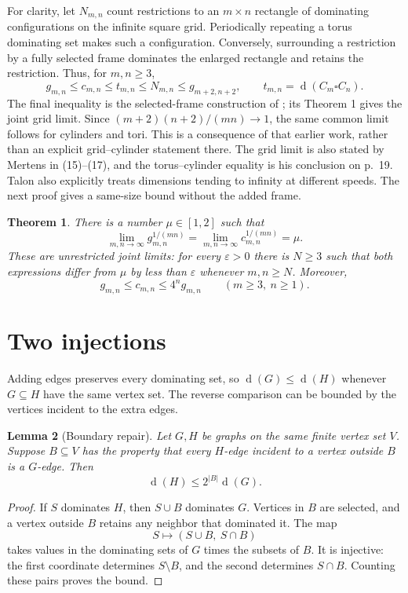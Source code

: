 \documentclass[11pt]{article}
\newtheorem{theorem}{Theorem}
\newtheorem{lemma}[theorem]{Lemma}
\newcommand{\ds}{\operatorname{d}}
\begin{document}
For clarity, let $N_{m,n}$ count restrictions to an $m\times n$ rectangle
of dominating configurations on the infinite square grid. Periodically
repeating a torus dominating set makes such a configuration. Conversely,
surrounding a restriction by a fully selected frame dominates the enlarged
rectangle and retains the restriction. Thus, for $m,n\ge3$,
\[
 g_{m,n}\le c_{m,n}\le t_{m,n}\le N_{m,n}\le g_{m+2,n+2},
 \qquad t_{m,n}=\ds(C_m\square C_n).
\]
The final inequality is the selected-frame construction of
\cite[Lemma 4, p.~91]{gangloff}; its Theorem 1 gives the joint grid
limit. Since $(m+2)(n+2)/(mn)\to1$, the same common limit follows for
cylinders and tori. This is a consequence of that earlier work, rather
than an explicit grid--cylinder statement there. The grid limit is also
stated by Mertens in (15)--(17), and the torus--cylinder equality is his
conclusion on p.~19. Talon \cite[Lemmas 3.6--3.7, pp.~62--63]{talon}
also explicitly treats dimensions tending to infinity at different speeds.
The next proof gives a same-size bound without the added frame.

\begin{theorem}\label{thm:main}
There is a number $\mu\in[1,2]$ such that
\[
 \lim_{m,n\to\infty}g_{m,n}^{1/(mn)}
 =\lim_{m,n\to\infty}c_{m,n}^{1/(mn)}=\mu.
\]
These are unrestricted joint limits: for every $\varepsilon>0$ there is
$N\ge3$ such that both expressions differ from $\mu$ by less than
$\varepsilon$ whenever $m,n\ge N$. Moreover,
\begin{equation}\label{eq:seam}
 g_{m,n}\le c_{m,n}\le4^n g_{m,n}
 \qquad(m\ge3,\ n\ge1).
\end{equation}
\end{theorem}

\section{Two injections}
Adding edges preserves every dominating set, so $\ds(G)\le\ds(H)$
whenever $G\subseteq H$ have the same vertex set. The reverse comparison
can be bounded by the vertices incident to the extra edges.

\begin{lemma}[Boundary repair]\label{lem:repair}
Let $G,H$ be graphs on the same finite vertex set $V$. Suppose $B\subseteq V$
has the property that every $H$-edge incident to a vertex outside $B$
is a $G$-edge. Then
\[
 \ds(H)\le 2^{|B|}\ds(G).
\]
\end{lemma}
\begin{proof}
If $S$ dominates $H$, then $S\cup B$ dominates $G$. Vertices in $B$
are selected, and a vertex outside $B$ retains any neighbor that
dominated it. The map
\[
 S\longmapsto (S\cup B,\ S\cap B)
\]
takes values in the dominating sets of $G$ times the subsets of $B$.
It is injective: the first coordinate determines $S\setminus B$, and
the second determines $S\cap B$. Counting these pairs proves the bound.
\end{proof}
\end{document}

